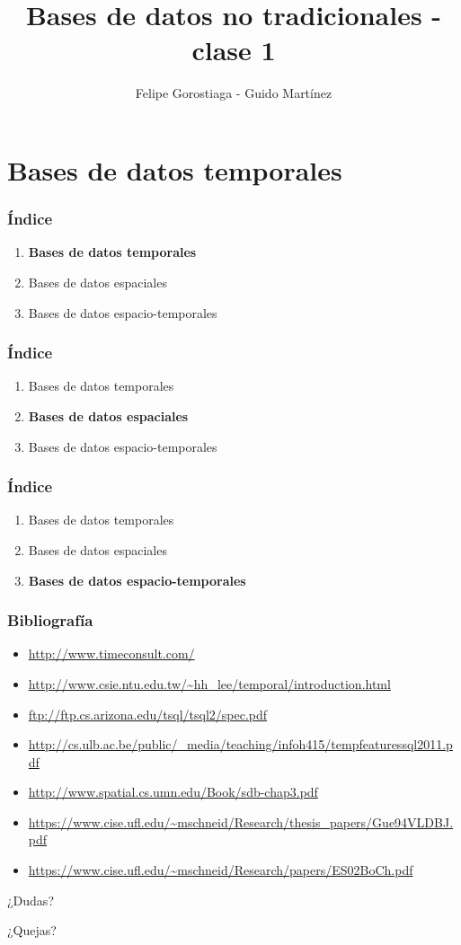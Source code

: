 \documentclass[obeyspaces,spaces,hyphens]{beamer}
\begin{document}
\title{Bases de datos no tradicionales - clase 1}
\author{Felipe Gorostiaga - Guido Martínez}

\begin{frame}
  \titlepage
\end{frame}

\section{Bases de datos temporales}

\begin{frame}
\frametitle{Índice}
	\begin{enumerate}
	\item {\bf Bases de datos temporales}
	\item Bases de datos espaciales
	\item Bases de datos espacio-temporales
	\end{enumerate}
\end{frame}



\begin{frame}
\frametitle{Índice}
	\begin{enumerate}
	\item Bases de datos temporales
	\item {\bf Bases de datos espaciales}
	\item Bases de datos espacio-temporales
	\end{enumerate}
\end{frame}



\begin{frame}
\frametitle{Índice}
	\begin{enumerate}
	\item Bases de datos temporales
	\item Bases de datos espaciales
	\item {\bf Bases de datos espacio-temporales}
	\end{enumerate}
\end{frame}



\begin{frame}
\frametitle{Bibliografía}
\begin{itemize}
	\footnotesize
	\item \url{http://www.timeconsult.com/}
	\item \url{http://www.csie.ntu.edu.tw/~hh_lee/temporal/introduction.html}
	\item \url{ftp://ftp.cs.arizona.edu/tsql/tsql2/spec.pdf}
	\item \url{http://cs.ulb.ac.be/public/_media/teaching/infoh415/tempfeaturessql2011.pdf}
	\item \url{http://www.spatial.cs.umn.edu/Book/sdb-chap3.pdf}
	\item \url{https://www.cise.ufl.edu/~mschneid/Research/thesis_papers/Gue94VLDBJ.pdf}
	\item \url{https://www.cise.ufl.edu/~mschneid/Research/papers/ES02BoCh.pdf}
\end{itemize}
\end{frame}

\begin{frame}
\begin{center}
	¿Dudas?
	\pause

	¿Quejas?
\end{center}
\end{frame}
\end{document}
